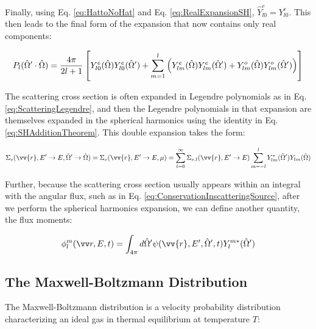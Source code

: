 Finally, using Eq. \eqref{eq:HattoNoHat} and Eq. \eqref{eq:RealExpansionSH}, \(\hat{Y}_{l0}^e=Y_{l0}^e\). This then leads to the final form of the expansion that now contains only real components:

\begin{equation}
\begin{aligned}
\label{eq:FullExpansion5}
P_l(\hat{\Omega}  '\cdot\hat{\Omega}  )=\frac{4\pi}{2l+1}\left\lbrack Y_{l0}^e(\hat{\Omega}  )Y_{l0}^e(\hat{\Omega}  ')+\sum_{m=1}^{l}\left(Y_{lm}^e(\hat{\Omega}  )Y_{lm}^{e}(\hat{\Omega}  ')+Y_{lm}^o(\hat{\Omega}  )Y_{lm}^{o}(\hat{\Omega}  ')\right)\right\rbrack\\
\end{aligned}
\end{equation}





The scattering cross section is often expanded in Legendre polynomials as in Eq. \ref{eq:ScatteringLegendre}, and then the Legendre polynomials in that expansion are themselves expanded in the spherical harmonics using the identity in Eq. \ref{eq:SHAdditionTheorem}. This double expansion takes the form:

\begin{equation}
\label{eq:ScatteringLegendreandSH}
\Sigma_s(\vv{r}, E'\rightarrow E, \hO  '\rightarrow\hO  ) = \Sigma_s(\vv{r}, E'\rightarrow E, \mu) = \sum_{l=0}^{\infty} \Sigma_{s,l}(\vv{r}, E'\rightarrow E) \sum_{m=-l}^{l} Y_{lm}^{*} (\hO  ') Y_{lm}(\hO  )
\end{equation}

Further, because the scattering cross section usually appears within an integral with the angular flux, such as in Eq. \ref{eq:ConservationInscatteringSource}, after we perform the spherical harmonics expansion, we can define another quantity, the flux moments:

\begin{equation}
\label{eq:FluxMomentSH}
\phi_l^m\spas = \int_{4\pi}^{} d\hO  '\psi(\vv{r}, E', \hO  ', t)Y_l^{m*}(\hO  ')
\end{equation}

\subsection{The Maxwell-Boltzmann Distribution}
\label{sec:MB}

The Maxwell-Boltzmann distribution is a velocity probability distribution characterizing an ideal gas in thermal equilibrium at temperature \(T\):

